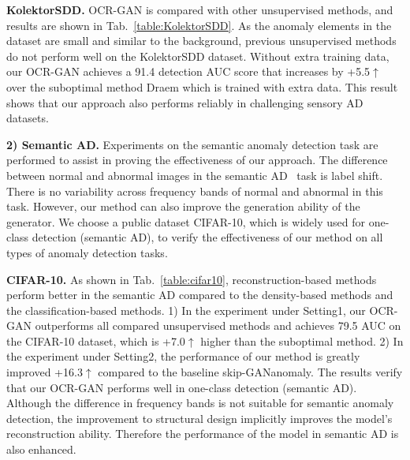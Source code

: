 \documentclass[lettersize,journal]{IEEEtran}
\begin{document}
\noindent\textbf{KolektorSDD.} OCR-GAN is compared with other unsupervised methods, and results are shown in Tab.~\ref{table:KolektorSDD}. As the anomaly elements in the dataset are small and similar to the background, previous unsupervised methods do not perform well on the KolektorSDD dataset. Without extra training data, our OCR-GAN achieves a 91.4 detection AUC score that increases by +5.5$\uparrow$ over the suboptimal method Draem which is trained with extra data. This result shows that our approach also performs reliably in challenging sensory AD datasets.


\noindent\textbf{2) Semantic AD.} Experiments on the semantic anomaly detection task are performed to assist in proving the effectiveness of our approach. The difference between normal and abnormal images in the semantic AD~\cite{perera2019learning} task is label shift. There is no variability across frequency bands of normal and abnormal in this task. However, our method can also improve the generation ability of the generator. We choose a public dataset CIFAR-10, which is widely used for one-class detection (semantic AD), to verify the effectiveness of our method on all types of anomaly detection tasks.

\noindent\textbf{CIFAR-10.} As shown in Tab.~\ref{table:cifar10}, reconstruction-based methods perform better in the semantic AD compared to the density-based methods and the classification-based methods. 1) In the experiment under Setting1, our OCR-GAN outperforms all compared unsupervised methods and achieves 79.5 AUC on the CIFAR-10 dataset, which is +7.0$\uparrow$ higher than the suboptimal method. 2) In the experiment under Setting2, the performance of our method is greatly improved +16.3$\uparrow$ compared to the baseline skip-GANanomaly. The results verify that our OCR-GAN performs well in one-class detection (semantic AD). Although the difference in frequency bands is not suitable for semantic anomaly detection, the improvement to structural design implicitly improves the model's reconstruction ability. Therefore the performance of the model in semantic AD is also enhanced.
\end{document}
